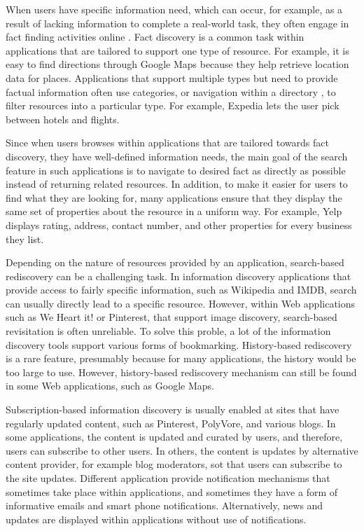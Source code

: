 \documentclass{casconpaper}
\begin{document}
{When users have specific information need, which can occur, for example, as a result of lacking information to complete a real-world task, they often engage in fact finding activities online \cite{kellar2006, kellar2007, sellen}. Fact discovery is a common task within applications that are tailored to support one type of resource. For example, it is easy to find directions through Google Maps because they help retrieve location data for places. Applications that support multiple types but need to provide factual information often use categories, or navigation within a directory \cite{levene}, to filter resources into a particular type. For example, Expedia lets the user pick between hotels and flights. 

Since when users browses within applications that are tailored towards fact discovery, they have well-defined information needs, the main goal of the search feature in such applications is to navigate to desired fact as directly as possible instead of returning related resources. In addition, to make it easier for users to find what they are looking for, many applications ensure that they display the same set of properties about the resource in a uniform way. For example, Yelp displays rating, address, contact number, and other properties for every business they list.

Depending on the nature of resources provided by an application, search-based rediscovery can be a challenging task. In information discovery applications that provide access to fairly specific information, such as Wikipedia and IMDB, search can usually directly lead to a specific resource. However, within Web applications such as We Heart it! or Pinterest, that support image discovery, search-based revisitation is often unreliable. To solve this proble, a lot of the information discovery tools support various forms of bookmarking. History-based rediscovery is a rare feature, presumably because for many applications, the history would be too large to use. However, history-based rediscovery mechanism can still be found in some Web applications, such as Google Maps.

Subscription-based information discovery is usually enabled at sites that have regularly updated content, such as Pinterest, PolyVore, and various blogs. In some applications, the content is updated and curated by users, and therefore, users can subscribe to other users. In others, the content is updates by alternative content provider, for example blog moderators, sot that users can subscribe to the site updates. Different application provide notification mechanisms that sometimes take place within applications, and sometimes they have a form of informative emails and smart phone notifications. Alternatively, news and updates are displayed within applications without use of notifications.

}
\end{document}
